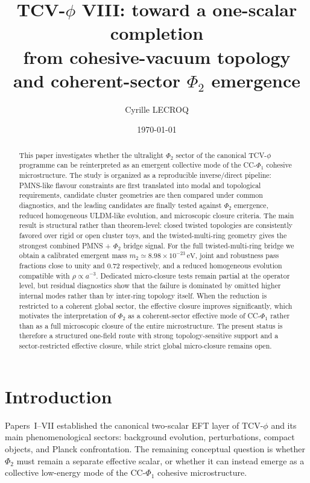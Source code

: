 \documentclass[aps,prd,onecolumn,nofootinbib,superscriptaddress]{revtex4-2}
\begin{document}
\title{TCV-$\phi$ VIII: toward a one-scalar completion\\
from cohesive-vacuum topology and coherent-sector $\Phi_2$ emergence}

\author{Cyrille LECROQ}

\date{\today}

\begin{abstract}
This paper investigates whether the ultralight $\Phi_2$ sector of the canonical TCV-$\phi$ programme can be reinterpreted as an emergent collective mode of the CC-$\Phi_1$ cohesive microstructure.
The study is organized as a reproducible inverse/direct pipeline:
PMNS-like flavour constraints are first translated into modal and topological requirements, candidate cluster geometries are then compared under common diagnostics, and the leading candidates are finally tested against $\Phi_2$ emergence, reduced homogeneous ULDM-like evolution, and microscopic closure criteria.
The main result is structural rather than theorem-level:
closed twisted topologies are consistently favored over rigid or open cluster toys, and the twisted-multi-ring geometry gives the strongest combined PMNS + $\Phi_2$ bridge signal.
For the full twisted-multi-ring bridge we obtain a calibrated emergent mass $m_2 \simeq 8.98\times10^{-23}\,\mathrm{eV}$, joint and robustness pass fractions close to unity and $0.72$ respectively, and a reduced homogeneous evolution compatible with $\rho\propto a^{-3}$.
Dedicated micro-closure tests remain partial at the operator level, but residual diagnostics show that the failure is dominated by omitted higher internal modes rather than by inter-ring topology itself.
When the reduction is restricted to a coherent global sector, the effective closure improves significantly, which motivates the interpretation of $\Phi_2$ as a coherent-sector effective mode of CC-$\Phi_1$ rather than as a full microscopic closure of the entire microstructure.
The present status is therefore a structured one-field route with strong topology-sensitive support and a sector-restricted effective closure, while strict global micro-closure remains open.
\end{abstract}

\maketitle

\section{Introduction}
Papers~I--VII established the canonical two-scalar EFT layer of TCV-$\phi$ and its main phenomenological sectors:
background evolution, perturbations, compact objects, and Planck confrontation.
The remaining conceptual question is whether $\Phi_2$ must remain a separate effective scalar, or whether it can instead emerge as a collective low-energy mode of the CC-$\Phi_1$ cohesive microstructure.
\end{document}
